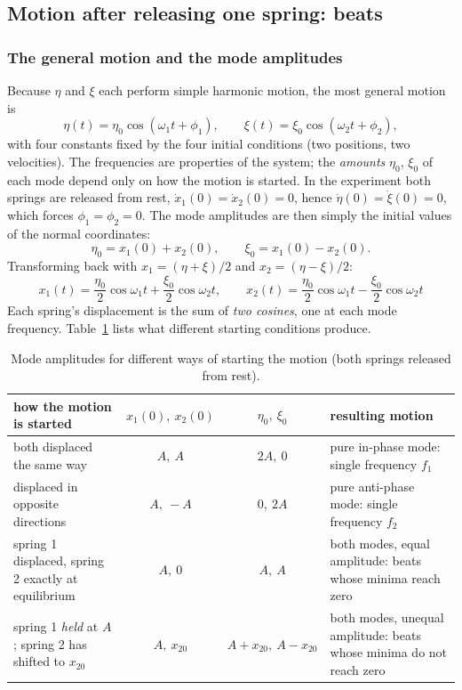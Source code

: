 \documentclass[11pt,a4paper]{article}
\begin{document}
\subsection{Motion after releasing one spring: beats}\label{sec:beats}

\subsubsection{The general motion and the mode amplitudes}

Because $\eta$ and $\xi$ each perform simple harmonic motion, the most general motion is
\begin{equation}
\eta(t)=\eta_0\cos(\omega_1t+\phi_1),\qquad \xi(t)=\xi_0\cos(\omega_2t+\phi_2),
\end{equation}
with four constants fixed by the four initial conditions (two positions, two velocities). The frequencies are properties of the system; the \emph{amounts} $\eta_0$, $\xi_0$ of each mode depend only on how the motion is started. In the experiment both springs are released from rest, $\dot x_1(0)=\dot x_2(0)=0$, hence $\dot\eta(0)=\dot\xi(0)=0$, which forces $\phi_1=\phi_2=0$. The mode amplitudes are then simply the initial values of the normal coordinates:
\begin{equation}
\eta_0=x_1(0)+x_2(0),\qquad \xi_0=x_1(0)-x_2(0).
\label{eq:amps}
\end{equation}
Transforming back with $x_1=(\eta+\xi)/2$ and $x_2=(\eta-\xi)/2$:
\begin{equation}
\boxed{\;x_1(t)=\frac{\eta_0}{2}\cos\omega_1t+\frac{\xi_0}{2}\cos\omega_2t,\qquad
x_2(t)=\frac{\eta_0}{2}\cos\omega_1t-\frac{\xi_0}{2}\cos\omega_2t\;}
\label{eq:solution}
\end{equation}
Each spring's displacement is the sum of \emph{two cosines}, one at each mode frequency. Table~\ref{tab:start} lists what different starting conditions produce.

\begin{table}[htbp]
\centering\small
\caption{Mode amplitudes for different ways of starting the motion (both springs released from rest).}
\label{tab:start}
\begin{tabular}{@{}p{4.0cm}ccp{5.6cm}@{}}
\toprule
how the motion is started & $x_1(0),\ x_2(0)$ & $\eta_0,\ \xi_0$ & resulting motion\\
\midrule
both displaced the same way & $A,\ A$ & $2A,\ 0$ & pure in-phase mode: single frequency $f_1$\\
displaced in opposite directions & $A,\ -A$ & $0,\ 2A$ & pure anti-phase mode: single frequency $f_2$\\
spring 1 displaced, spring 2 exactly at equilibrium & $A,\ 0$ & $A,\ A$ & both modes, equal amplitude: beats whose minima reach zero\\
spring 1 \emph{held} at $A$; spring 2 has shifted to $x_{20}$ & $A,\ x_{20}$ & $A+x_{20},\ A-x_{20}$ & both modes, unequal amplitude: beats whose minima do not reach zero\\
\bottomrule
\end{tabular}
\end{table}
\end{document}
